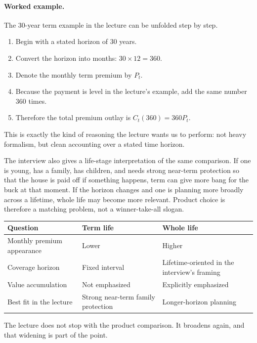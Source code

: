 \paragraph{Worked example.} The 30-year term example in the lecture can be unfolded step by step.
\begin{enumerate}
\item Begin with a stated horizon of \(30\) years.
\item Convert the horizon into months: \(30 \times 12 = 360\).
\item Denote the monthly term premium by \(P_t\).
\item Because the payment is level in the lecture's example, add the same number \(360\) times.
\item Therefore the total premium outlay is \(C_t(360) = 360 P_t\).
\end{enumerate}

This is exactly the kind of reasoning the lecture wants us to perform: not heavy formalism, but clean accounting over a stated time horizon.

The interview also gives a life-stage interpretation of the same comparison. If one is young, has a family, has children, and needs strong near-term protection so that the house is paid off if something happens, term can give more bang for the buck at that moment. If the horizon changes and one is planning more broadly across a lifetime, whole life may become more relevant. Product choice is therefore a matching problem, not a winner-take-all slogan.

\begin{table}
\centering
\begin{tabular}{|l|l|l|}
\hline
Question & Term life & Whole life \\
\hline
Monthly premium appearance & Lower & Higher \\
\hline
Coverage horizon & Fixed interval & Lifetime-oriented in the interview's framing \\
\hline
Value accumulation & Not emphasized & Explicitly emphasized \\
\hline
Best fit in the lecture & Strong near-term family protection & Longer-horizon planning \\
\hline
\end{tabular}
\end{table}

The lecture does not stop with the product comparison. It broadens again, and that widening is part of the point.

